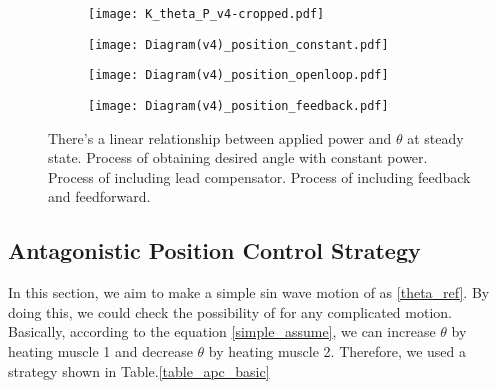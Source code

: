 \begin{figure}[t]
	\centering
	\begin{minipage}{0.30\textwidth}
		\begin{subfigure}{\linewidth}
			\centering
			\texttt{[image: K\_theta\_P\_v4-cropped.pdf]}
			\caption{\label{KthetaP}}
		\end{subfigure}
	\end{minipage}%
	\begin{minipage}{0.6\textwidth}
		\centering
		\begin{subfigure}{0.55\linewidth}
			\centering
			\texttt{[image: Diagram(v4)\_position\_constant.pdf]}
			\caption{\label{AntaControl_constant}}
		\end{subfigure}
		
		\begin{subfigure}{0.73\linewidth}
			\centering
			\texttt{[image: Diagram(v4)\_position\_openloop.pdf]}
			\caption{\label{position_open_loop}}
		\end{subfigure}
		
		\begin{subfigure}{\linewidth}
			\centering
			\texttt{[image: Diagram(v4)\_position\_feedback.pdf]}
			\caption{\label{position_closed_loop}}
		\end{subfigure}
	\end{minipage}
	\caption[Block diagrams for \apc]{ There's a linear relationship between applied power and $\theta$ at steady state.  Process of obtaining desired angle with constant power.  Process of \apc including lead compensator.  Process of \apc including feedback and feedforward.}
	\label{anta_position_diagrams}
\end{figure}


\subsection{Antagonistic Position Control Strategy}
In this section, we aim to make a simple sin wave motion of \anta as \eqref{theta_ref}. By doing this, we could check the possibility of \apc for any complicated motion. Basically, according to the equation \eqref{simple_assume}, we can increase $\theta$ by heating muscle 1 and decrease $\theta$ by heating muscle 2. Therefore, we used a strategy shown in Table.\ref{table_apc_basic}

